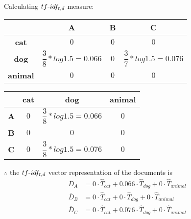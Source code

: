 \documentclass[11pt]{exam}
\newcommand\tab[1][1cm]{\hspace*{#1}}
\begin{document}
\begin{questions}
\begin{solution}
    Calculating $tf{\text -}idf_{t,d}$ measure:\\
    \begin{center}
        \begin{tabular}{|c||c|c|c|}
        \hline
             &\textbf{A} & \textbf{\tab B\tab} & \textbf{C}  \\
             \hline\hline
             \textbf{cat} & $0$ & $0$ & $0$\\[1em]
             \hline
             \textbf{dog} & $\dfrac{3}{8}*log1.5 = 0.066$ & $0$ & $\dfrac{3}{7}*log1.5 = 0.076$\\[1em]
             \hline
             \textbf{animal} & $0$ & $0$ & $0$\\[1em]
             \hline
        \end{tabular}
    \end{center}
    \begin{center}
        \begin{tabular}{|c||c|c|c|}
        \hline
            \tab &\textbf{cat} & \textbf{dog} & \textbf{animal}  \\
             \hline\hline
             \textbf{A} & $0$ & $\dfrac{3}{8}*log1.5 = 0.066$ & $0$\\[1em]
             \hline
             \textbf{B} & $0$ & $0$ & $0$\\[1em]
             \hline
             \textbf{C} & $0$ & $\dfrac{3}{8}*log1.5 = 0.076$ & $0$\\[1em]
             \hline
        \end{tabular}
    \end{center}
    $\therefore$ the $tf{\text -}idf_{t,d}$ vector representation of the documents is\\
    \begin{align*}
        \overline{D}_A &= 0 \cdot \hat{T}_{cat} + 0.066 \cdot \hat{T}_{dog} + 0 \cdot \hat{T}_{animal}\\
        \overline{D}_B &= 0 \cdot \hat{T}_{cat} + 0 \cdot \hat{T}_{dog} + 0 \cdot \hat{T}_{animal}\\
        \overline{D}_C &= 0 \cdot \hat{T}_{cat} + 0.076 \cdot \hat{T}_{dog} + 0 \cdot \hat{T}_{animal}\\
    \end{align*}
    \end{solution}

\end{questions}
\end{document}
